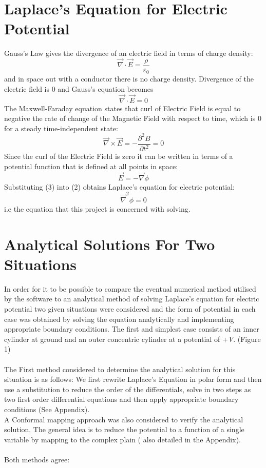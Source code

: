\documentclass{article}
\begin{document}
\section{Laplace's Equation for Electric Potential}
Gauss's Law gives the divergence of an electric field in terms of charge density: 
\begin{equation}
\vec{\nabla} \cdot \vec{E} = \frac{\rho}{\varepsilon_{0}}
\label{1}
\end{equation}
and in space out with a conductor there is no charge density.  Divergence of the electric field is 0 and Gauss's equation becomes
\begin{equation}
\vec{\nabla} \cdot \vec{E} =0
\label{2}
\end{equation}
The Maxwell-Faraday equation states that curl of Electric Field is equal to negative the rate of change of the Magnetic Field with respect to time, which is 0 for a steady time-independent state:
\begin{equation}
\vec{\nabla}\times\vec{E} = -\frac{\partial^2{B}}{\partial{t}^2} = 0
\label{3}
\end{equation}
Since the curl of the Electric Field is zero it can be written in terms of a potential function \phi\) that is defined at all points in space:
\begin{equation}
\vec{E} = -\vec{\nabla}\phi
\label{eq:efield}
\end{equation}
Substituting (3) into (2) obtains Laplace's equation for electric potential:
\begin{equation}
\vec{\nabla}^2\phi = 0
\label{eq:laplace}
\end{equation}
i.e the equation that this project is concerned with solving.
\section{Analytical Solutions For Two Situations} 
In order for it to be possible to compare the eventual numerical method utilised by the software to an analytical method of solving Laplace's equation for electric potential two given situations were considered and the form of potential in each case was obtained by solving the equation analytically and implementing appropriate boundary conditions. 
\newline The first and simplest case consists of an inner cylinder at ground and an outer concentric cylinder at a potential of +\textit{V}. (Figure 1) \\
\\
The First method considered to determine the analytical solution for this situation is as follows: We first rewrite Laplace's Equation in polar form and then use a substitution to reduce the order of the differentials, solve in two steps as two first order differential equations and then apply appropriate boundary conditions (See Appendix). \\
A Conformal mapping approach was also considered to verify the analytical solution. The general idea is to reduce the potential to a function of a single variable by mapping to the complex plain ( also detailed in the Appendix).  \\
\\
Both methods agree: 
\end{document}
